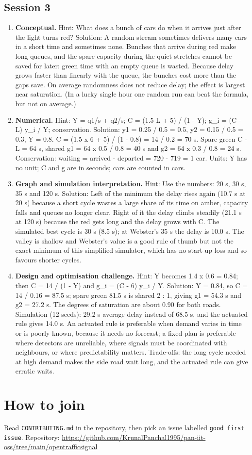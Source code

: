 \documentclass[11pt,a4paper]{article}
\begin{document}
\subsection*{Session 3}
\begin{enumerate}[nosep]
\item \textbf{Conceptual.} Hint: What does a bunch of cars do when it arrives just after the light turns red? Solution: A random stream sometimes delivers many cars in a short time and sometimes none. Bunches that arrive during red make long queues, and the spare capacity during the quiet stretches cannot be saved for later: green time with an empty queue is wasted. Because delay grows faster than linearly with the queue, the bunches cost more than the gaps save. On average randomness does not reduce delay; the effect is largest near saturation. (In a lucky single hour one random run can beat the formula, but not on average.)
\item \textbf{Numerical.} Hint: Y = q1/s + q2/s; C = (1.5 L + 5) / (1 - Y); g\_i = (C - L) y\_i / Y; conservation. Solution: y1 = 0.25 / 0.5 = 0.5, y2 = 0.15 / 0.5 = 0.3, Y = 0.8. C = (1.5 x 6 + 5) / (1 - 0.8) = 14 / 0.2 = 70 s. Spare green C - L = 64 s, shared g1 = 64 x 0.5 / 0.8 = 40 s and g2 = 64 x 0.3 / 0.8 = 24 s. Conservation: waiting = arrived - departed = 720 - 719 = 1 car. Units: Y has no unit; C and g are in seconds; cars are counted in cars.
\item \textbf{Graph and simulation interpretation.} Hint: Use the numbers: 20 s, 30 s, 35 s and 120 s. Solution: Left of the minimum the delay rises again (10.7 s at 20 s) because a short cycle wastes a large share of its time on amber, capacity falls and queues no longer clear. Right of it the delay climbs steadily (21.1 s at 120 s) because the red gets long and the delay grows with C. The simulated best cycle is 30 s (8.5 s); at Webster's 35 s the delay is 10.0 s. The valley is shallow and Webster's value is a good rule of thumb but not the exact minimum of this simplified simulator, which has no start-up loss and so favours shorter cycles.
\item \textbf{Design and optimisation challenge.} Hint: Y becomes 1.4 x 0.6 = 0.84; then C = 14 / (1 - Y) and g\_i = (C - 6) y\_i / Y. Solution: Y = 0.84, so C = 14 / 0.16 = 87.5 s; spare green 81.5 s is shared 2 : 1, giving g1 = 54.3 s and g2 = 27.2 s. The degrees of saturation are about 0.90 for both roads. Simulation (12 seeds): 29.2 s average delay instead of 68.5 s, and the actuated rule gives 14.0 s. An actuated rule is preferable when demand varies in time or is poorly known, because it needs no forecast; a fixed plan is preferable where detectors are unreliable, where signals must be coordinated with neighbours, or where predictability matters. Trade-offs: the long cycle needed at high demand makes the side road wait long, and the actuated rule can give erratic waits.
\end{enumerate}

\section{How to join}
Read \texttt{CONTRIBUTING.md} in the repository, then pick an issue labelled \texttt{good first issue}. Repository: \url{https://github.com/KrunalPanchal1995/pan-iit-oss/tree/main/opentrafficsignal}
\end{document}
